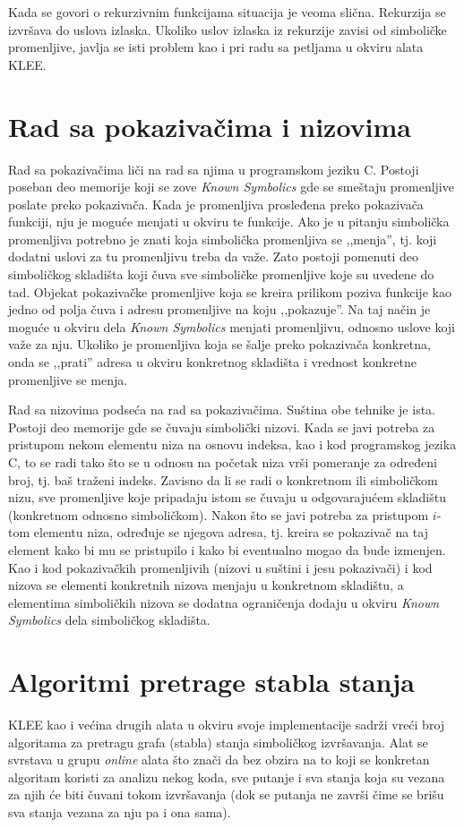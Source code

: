 \documentclass[12pt,oneside]{memoir}
\begin{document}
Kada se govori o rekurzivnim funkcijama situacija je veoma slična. Rekurzija se izvršava do uslova izlaska. Ukoliko uslov izlaska iz rekurzije zavisi od simboličke promenljive, javlja se isti problem kao i pri radu sa petljama u okviru alata KLEE.

\section{Rad sa pokazivačima i nizovima}
Rad sa pokazivačima liči na rad sa njima u programskom jeziku C. Postoji poseban deo memorije koji se zove \textit{Known Symbolics} gde se smeštaju promenljive poslate preko pokazivača. Kada je promenljiva prosleđena preko pokazivača funkciji, nju je moguće menjati u okviru te funkcije. Ako je u pitanju simbolička promenljiva potrebno je znati koja simbolička promenljiva se ,,menja'', tj. koji dodatni uslovi za tu promenljivu treba da važe. Zato postoji pomenuti deo simboličkog skladišta koji čuva sve simboličke promenljive koje su uvedene do tad. Objekat pokazivačke promenljive koja se kreira prilikom poziva funkcije kao jedno od polja čuva i adresu promenljive na koju ,,pokazuje''. Na taj način je moguće u okviru dela \textit{Known Symbolics} menjati promenljivu, odnosno uslove koji važe za nju. Ukoliko je promenljiva koja se šalje preko pokazivača konkretna, onda se ,,prati'' adresa u okviru konkretnog skladišta i vrednost konkretne promenljive se menja.

Rad sa nizovima podseća na rad sa pokazivačima. Suština obe tehnike je ista. Postoji deo memorije gde se čuvaju simbolički nizovi. Kada se javi potreba za pristupom nekom elementu niza na osnovu indeksa, kao i kod programskog jezika C, to se radi tako što se u odnosu na početak niza vrši pomeranje za određeni broj, tj. baš traženi indeks. Zavisno da li se radi o konkretnom ili simboličkom nizu, sve promenljive koje pripadaju istom se čuvaju u odgovarajućem skladištu (konkretnom odnosno simboličkom). Nakon što se javi potreba za pristupom $i$-tom elementu niza, određuje se njegova adresa, tj. kreira se pokazivač na taj element kako bi mu se pristupilo i kako bi eventualno mogao da bude izmenjen. Kao i kod pokazivačkih promenljivih (nizovi u suštini i jesu pokazivači) i kod nizova se elementi konkretnih nizova menjaju u konkretnom skladištu, a elementima simboličkih nizova se dodatna ograničenja dodaju u okviru \textit{Known Symbolics} dela simboličkog skladišta.  

\section{Algoritmi pretrage stabla stanja} \label{algoritmi}
KLEE kao i većina drugih alata u okviru svoje implementacije sadrži vreći broj algoritama za pretragu grafa (stabla) stanja simboličkog izvršavanja. Alat se svrstava u grupu \textit{online} alata što znači da bez obzira na to koji se konkretan algoritam koristi za analizu nekog koda, sve putanje i sva stanja koja su vezana za njih će biti čuvani tokom izvršavanja (dok se putanja ne završi čime se brišu sva stanja vezana za nju pa i ona sama).
\end{document}
